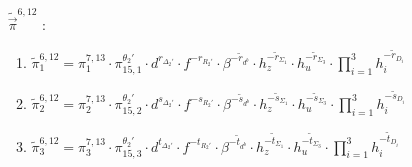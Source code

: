 \begin{enumerate}
\begin{enumerate}
  \end{enumerate}
\item[$\tilde{\vec{\pi}}^{6,12}$]:
  \begin{enumerate}
  \item $\tilde{\pi}^{6,12}_1 = \pi^{7,13}_1 \cdot \pi_{15,1}^{\theta_2'} \cdot d^{r_{\Delta_2'}} \cdot f^{-r_{R_2'}} \cdot \beta^{-\tilde{r}_{d^b}} \cdot h_z^{-\tilde{r}_{\Sigma_1}} \cdot h_u^{-\tilde{r}_{\Sigma_3}}\cdot \prod_{i = 1}^3 h_i^{-\tilde{r}_{D_i}}$
  \item $\tilde{\pi}^{6,12}_2 = \pi^{7,13}_2 \cdot \pi_{15,2}^{\theta_2'} \cdot d^{s_{\Delta_2'}} \cdot f^{-s_{R_2'}} \cdot \beta^{-\tilde{s}_{d^b}} \cdot h_z^{-\tilde{s}_{\Sigma_1}} \cdot h_u^{-\tilde{s}_{\Sigma_3}}\cdot \prod_{i = 1}^3 h_i^{-\tilde{s}_{D_i}}$
  \item $\tilde{\pi}^{6,12}_3 = \pi^{7,13}_3 \cdot \pi_{15,3}^{\theta_2'} \cdot d^{t_{\Delta_2'}} \cdot f^{-t_{R_2'}} \cdot \beta^{-\tilde{t}_{d^b}} \cdot h_z^{-\tilde{t}_{\Sigma_1}} \cdot h_u^{-\tilde{t}_{\Sigma_3}}\cdot \prod_{i = 1}^3 h_i^{-\tilde{t}_{D_i}}$
  \end{enumerate}
\end{enumerate}
